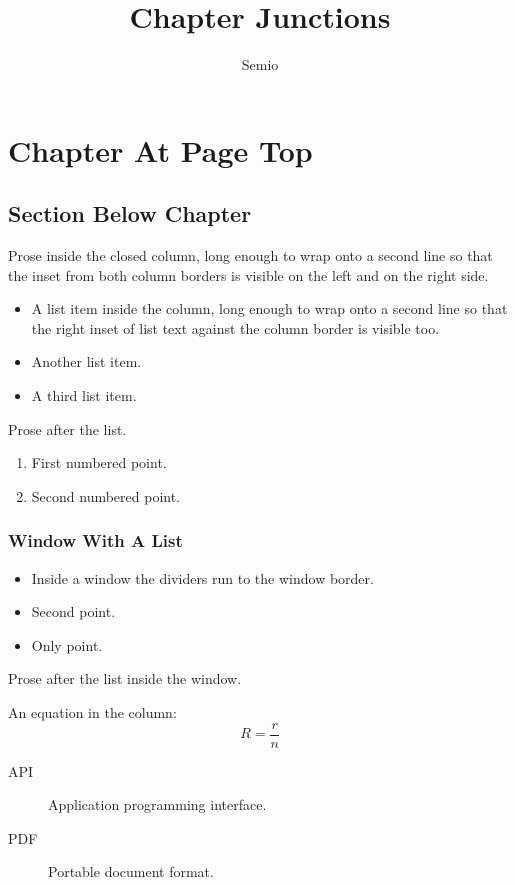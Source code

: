 \documentclass[type=report,theme=light,language=en]{semio}
\title{Chapter Junctions}
\author{Semio}
\date{}
\begin{document}
\chapter{Chapter At Page Top}
\section{Section Below Chapter}
Prose inside the closed column, long enough to wrap onto a second line so that the inset from both column borders is visible on the left and on the right side.
\begin{itemize}
\item A list item inside the column, long enough to wrap onto a second line so that the right inset of list text against the column border is visible too.
\item Another list item.
\item A third list item.
\end{itemize}
Prose after the list.
\begin{enumerate}
\item First numbered point.
\item Second numbered point.
\end{enumerate}
\subsection{Window With A List}
\begin{Window}[title={Steps}]
\begin{itemize}
\item Inside a window the dividers run to the window border.
\item Second point.
\end{itemize}
\end{Window}
\begin{Window}[title={List Then Prose}]
\begin{itemize}
\item Only point.
\end{itemize}
Prose after the list inside the window.
\end{Window}

An equation in the column:
\begin{equation}
R = \frac{r}{n}
\end{equation}
\begin{description}
\item[API] Application programming interface.
\item[PDF] Portable document format.
\end{description}
\end{document}
